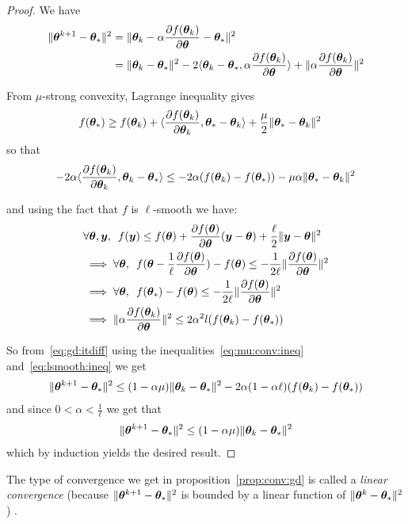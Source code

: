\begin{proof}
  We have 
  \begin{align}
    \| \thetab^{k+1} - \thetab_* \|^2 &= \| \thetab_k -\alpha \partialfrac{\thetab}{f(\thetab_k)} - \thetab_* \|^2 \\
                            &= \| \thetab_k - \thetab_* \|^2  - 2 \dotp{ \thetab_k - \thetab_* }{ \alpha \partialfrac{\thetab}{f(\thetab_k)} } + \|\alpha \partialfrac{\thetab}{f(\thetab_k)} \|^2  \label{eq:gd:itdiff}
 \end{align}

 From $\mu$-strong convexity, Lagrange inequality gives
 \begin{align}
   &f(\thetab_*) \geq f(\thetab_k) + \dotp{ \partialfrac{\thetab_k}{f(\thetab_k)} }{ \thetab_* - \thetab_k } + \frac{\mu}{2} \|\thetab_* - \thetab_k \|^2
 \end{align}
 so that 
 \begin{align}
   -2 \alpha \dotp{ \partialfrac{\thetab_k}{f(\thetab_k)} }{ \thetab_k -  \thetab_*} \leq  -2 \alpha(f(\thetab_k) - f(\thetab_*)) - \mu \alpha \|\thetab_* - \thetab_k \|^2 \label{eq:mu:conv:ineq}
   \end{align}

   and using the fact that $f$ is $\ell$-smooth we have: 
   \begin{align}
     &\forall \thetab, \yb, \enspace f(\yb) \leq f(\thetab) + \partialfrac{\thetab}{f(\thetab)} (\yb - \thetab) + \frac{\ell}{2} \| \yb - \thetab \|^2 \\
     &\implies \forall \thetab, \enspace f(\thetab - \frac1{\ell} \partialfrac{\thetab}{f(\thetab)}) - f(\thetab) \leq -\frac1{2\ell} \| \partialfrac{\thetab}{f(\thetab)} \|^2 \\
     &\implies \forall \thetab, \enspace f(\thetab_*) - f(\thetab) \leq -\frac1{2\ell} \| \partialfrac{\thetab}{f(\thetab)} \|^2  \\
     &\implies \|\alpha \partialfrac{\thetab}{f(\thetab_k)} \|^2 \leq 2\alpha^2 l(f(\thetab_k) - f(\thetab_*)) \label{eq:lsmooth:ineq}
   \end{align}

   So from~\eqref{eq:gd:itdiff} using the inequalities~\eqref{eq:mu:conv:ineq}
   and~\eqref{eq:lsmooth:ineq} we get
   \begin{align}
     \| \thetab^{k+1} - \thetab_* \|^2 \leq (1 - \alpha \mu)\| \thetab_k - \thetab_* \|^2 -2 \alpha (1 - \alpha \ell) (f(\thetab_k) - f(\thetab_*))
   \end{align} 
   and since $0 < \alpha < \frac1{\ell}$ we get that 
   \begin{align}
     \| \thetab^{k+1} - \thetab_* \|^2 \leq (1 - \alpha \mu)\| \thetab_k - \thetab_* \|^2
   \end{align}
   which by induction yields the desired result.
\end{proof}
The type of convergence we get in proposition~\ref{prop:conv:gd} is called a
\emph{linear convergence} (because $\| \thetab^{k+1} - \thetab_*
\|^2$ is bounded by a linear function of  $\|\thetab^{k} - \thetab_* \|^2$) .

